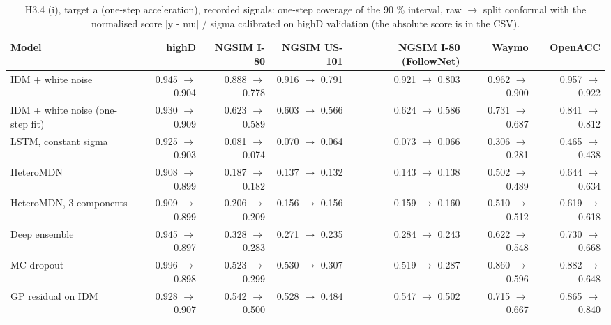 \begin{table}[htbp]
\centering
\footnotesize
\caption{H3.4 (i), target a (one-step acceleration), recorded signals: one-step coverage of the 90 \% interval, raw $\rightarrow$ split conformal with the normalised score $|$y - mu$|$ / sigma calibrated on highD validation (the absolute score is in the CSV).}
\label{tab:t4-onestep-conformal--raw--a}
\begin{tabular}{lrrrrrr}
\toprule
Model & highD & NGSIM I-80 & NGSIM US-101 & NGSIM I-80 (FollowNet) & Waymo & OpenACC \\
\midrule
IDM + white noise & 0.945 $\rightarrow$ 0.904 & 0.888 $\rightarrow$ 0.778 & 0.916 $\rightarrow$ 0.791 & 0.921 $\rightarrow$ 0.803 & 0.962 $\rightarrow$ 0.900 & 0.957 $\rightarrow$ 0.922 \\
IDM + white noise (one-step fit) & 0.930 $\rightarrow$ 0.909 & 0.623 $\rightarrow$ 0.589 & 0.603 $\rightarrow$ 0.566 & 0.624 $\rightarrow$ 0.586 & 0.731 $\rightarrow$ 0.687 & 0.841 $\rightarrow$ 0.812 \\
LSTM, constant sigma & 0.925 $\rightarrow$ 0.903 & 0.081 $\rightarrow$ 0.074 & 0.070 $\rightarrow$ 0.064 & 0.073 $\rightarrow$ 0.066 & 0.306 $\rightarrow$ 0.281 & 0.465 $\rightarrow$ 0.438 \\
HeteroMDN & 0.908 $\rightarrow$ 0.899 & 0.187 $\rightarrow$ 0.182 & 0.137 $\rightarrow$ 0.132 & 0.143 $\rightarrow$ 0.138 & 0.502 $\rightarrow$ 0.489 & 0.644 $\rightarrow$ 0.634 \\
HeteroMDN, 3 components & 0.909 $\rightarrow$ 0.899 & 0.206 $\rightarrow$ 0.209 & 0.156 $\rightarrow$ 0.156 & 0.159 $\rightarrow$ 0.160 & 0.510 $\rightarrow$ 0.512 & 0.619 $\rightarrow$ 0.618 \\
Deep ensemble & 0.945 $\rightarrow$ 0.897 & 0.328 $\rightarrow$ 0.283 & 0.271 $\rightarrow$ 0.235 & 0.284 $\rightarrow$ 0.243 & 0.622 $\rightarrow$ 0.548 & 0.730 $\rightarrow$ 0.668 \\
MC dropout & 0.996 $\rightarrow$ 0.898 & 0.523 $\rightarrow$ 0.299 & 0.530 $\rightarrow$ 0.307 & 0.519 $\rightarrow$ 0.287 & 0.860 $\rightarrow$ 0.596 & 0.882 $\rightarrow$ 0.648 \\
GP residual on IDM & 0.928 $\rightarrow$ 0.907 & 0.542 $\rightarrow$ 0.500 & 0.528 $\rightarrow$ 0.484 & 0.547 $\rightarrow$ 0.502 & 0.715 $\rightarrow$ 0.667 & 0.865 $\rightarrow$ 0.840 \\

\end{tabular}
\end{table}
